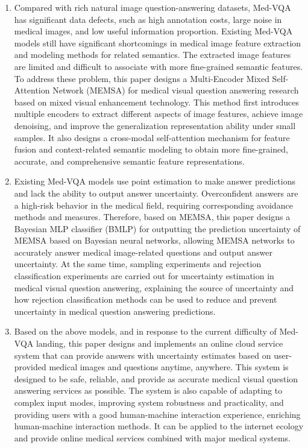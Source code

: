 \begin{enumerate}
	\item Compared with rich natural image question-answering datasets, Med-VQA has significant data defects, such as high annotation costs, large noise in medical images, and low useful information proportion. 
	Existing Med-VQA models still have significant shortcomings in medical image feature extraction and modeling methods for related semantics. The extracted image features are limited and difficult to associate with more fine-grained semantic features. 
	To address these problem, this paper designs a Multi-Encoder Mixed Self-Attention Network (MEMSA) for medical visual question answering research based on mixed visual enhancement technology. 
	This method first introduces multiple encoders to extract different aspects of image features, achieve image denoising, and improve the generalization representation ability under small samples. 
	It also designs a cross-modal self-attention mechanism for feature fusion and context-related semantic modeling to obtain more fine-grained, accurate, and comprehensive semantic feature representations.
	\item Existing Med-VQA models use point estimation to make answer predictions and lack the ability to output answer uncertainty. Overconfident answers are a high-risk behavior in the medical field, requiring corresponding avoidance methods and measures. 
	Therefore, based on MEMSA, this paper designs a Bayesian MLP classifier (BMLP) for outputting the prediction uncertainty of MEMSA based on Bayesian neural networks, allowing MEMSA networks to accurately answer medical image-related questions and output answer uncertainty. 
	At the same time, sampling experiments and rejection classification experiments are carried out for uncertainty estimation in medical visual question answering, explaining the source of uncertainty and how rejection classification methods can be used to reduce and prevent uncertainty in medical question answering predictions.
	\item Based on the above models, and in response to the current difficulty of Med-VQA landing, this paper designs and implements an online cloud service system that can provide answers with uncertainty estimates based on user-provided medical images and questions anytime, anywhere. 
	This system is designed to be safe, reliable, and provide as accurate medical visual question answering services as possible. The system is also capable of adapting to complex input modes, improving system robustness and practicality, and providing users with a good human-machine interaction experience, enriching human-machine interaction methods. 
	It can be applied to the internet ecology and provide online medical services combined with major medical systems.
\end{enumerate}

